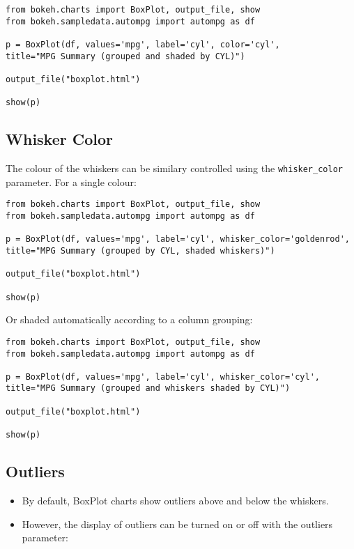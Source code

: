 \documentclass[a4paper,12pt]{article}
\begin{document}
\bigskip
{
	\large
	\begin{verbatim}
from bokeh.charts import BoxPlot, output_file, show
from bokeh.sampledata.autompg import autompg as df

p = BoxPlot(df, values='mpg', label='cyl', color='cyl',
title="MPG Summary (grouped and shaded by CYL)")

output_file("boxplot.html")

show(p)
\end{verbatim}
}
\newpage
\subsection*{Whisker Color}
The colour of the whiskers can be similary controlled using the \texttt{whisker\_color} parameter. For a single colour:
{
	\large

\begin{verbatim}
from bokeh.charts import BoxPlot, output_file, show
from bokeh.sampledata.autompg import autompg as df

p = BoxPlot(df, values='mpg', label='cyl', whisker_color='goldenrod',
title="MPG Summary (grouped by CYL, shaded whiskers)")

output_file("boxplot.html")

show(p)
\end{verbatim}

}
\bigskip
\noindent Or shaded automatically according to a column grouping:\\

\bigskip
{
	\large
\begin{verbatim}
from bokeh.charts import BoxPlot, output_file, show
from bokeh.sampledata.autompg import autompg as df

p = BoxPlot(df, values='mpg', label='cyl', whisker_color='cyl',
title="MPG Summary (grouped and whiskers shaded by CYL)")

output_file("boxplot.html")

show(p)
\end{verbatim}

}
\newpage
\subsection*{Outliers}
\begin{itemize}
\item By default, BoxPlot charts show outliers above and below the whiskers. 
\item However, the display of outliers can be turned on or off with the outliers parameter:
\end{itemize}
\end{document}
